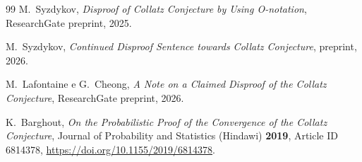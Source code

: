 \documentclass[11pt]{article}
\begin{document}
\begin{thebibliography}{99}
 M.\ Syzdykov, \emph{Disproof of Collatz
  Conjecture by Using O-notation}, ResearchGate preprint, 2025.

 M.\ Syzdykov, \emph{Continued Disproof Sentence
  towards Collatz Conjecture}, preprint, 2026.

 M.\ Lafontaine e G.\ Cheong, \emph{A
  Note on a Claimed Disproof of the Collatz Conjecture}, ResearchGate
  preprint, 2026.

 K.\ Barghout, \emph{On the Probabilistic Proof
  of the Convergence of the Collatz Conjecture}, Journal of Probability
  and Statistics (Hindawi) \textbf{2019}, Article ID 6814378,
  \url{https://doi.org/10.1155/2019/6814378}.

\end{thebibliography}
\end{document}
